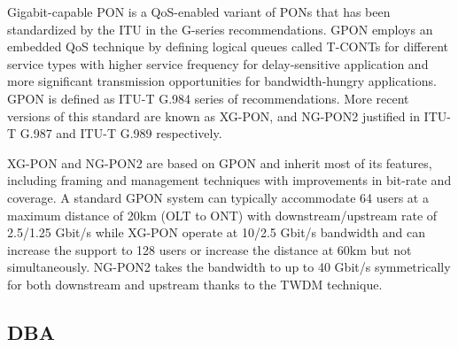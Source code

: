 Gigabit-capable \ac{PON} is a \ac{QoS}-enabled variant of \acp{PON} that has been standardized by the \ac{ITU} in the G-series recommendations. \ac{GPON} employs an embedded \ac{QoS} technique by defining logical queues called \acp{T-CONT} for different service types with higher service frequency for delay-sensitive application and more significant transmission opportunities for bandwidth-hungry applications. \ac{GPON} is defined as ITU-T G.984 \cite{itu984} series of recommendations. More recent versions of this standard are known as \ac{XG-PON}, and \ac{NG-PON2} justified in ITU-T G.987 \cite{itu987} and ITU-T G.989 \cite{itu989} respectively.

\ac{XG-PON} and \ac{NG-PON2} are based on \ac{GPON} and inherit most of its features, including framing and management techniques with improvements in bit-rate and coverage. A standard \ac{GPON} system can typically accommodate 64 users at a maximum distance of 20km (OLT to ONT) with downstream/upstream rate of 2.5/1.25 Gbit/s while \ac{XG-PON} operate at 10/2.5 Gbit/s bandwidth and can increase the support to 128 users or increase the distance at 60km but not simultaneously. \ac{NG-PON2} takes the bandwidth to up to 40 Gbit/s symmetrically for both downstream and upstream thanks to the TWDM technique.

\subsection{\acf{DBA}}
\label{Back:Sec:PON:sub:DBA}





